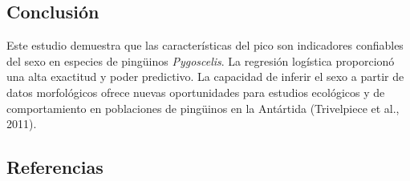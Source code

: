 \documentclass[
]{agujournal2019}
\begin{document}
\subsection{Conclusión}\label{conclusiuxf3n}

Este estudio demuestra que las características del pico son indicadores
confiables del sexo en especies de pingüinos \emph{Pygoscelis}. La
regresión logística proporcionó una alta exactitud y poder predictivo.
La capacidad de inferir el sexo a partir de datos morfológicos ofrece
nuevas oportunidades para estudios ecológicos y de comportamiento en
poblaciones de pingüinos en la Antártida (Trivelpiece et al., 2011).

\subsection*{Referencias}\label{referencias}
\end{document}
